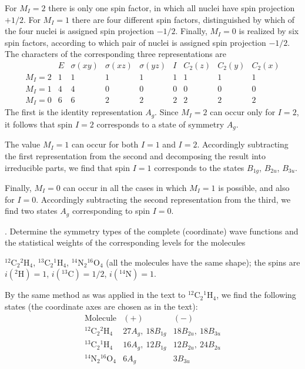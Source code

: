 For $M_I=2$ there is only one spin factor, in which all nuclei have spin projection $+1/2$. For $M_I=1$ there are four different spin factors, distinguished by which of the four nuclei is assigned spin projection $-1/2$. Finally, $M_I=0$ is realized by six spin factors, according to which pair of nuclei is assigned spin projection $-1/2$. The characters of the corresponding three representations are
\[
\begin{array}{c|cccccccc}
 &E&\sigma(xy)&\sigma(xz)&\sigma(yz)&I&C_2(z)&C_2(y)&C_2(x)\\\hline
M_I=2&1&1&1&1&1&1&1&1\\
M_I=1&4&4&0&0&0&0&0&0\\
M_I=0&6&6&2&2&2&2&2&2
\end{array}
\]
The first is the identity representation $A_g$. Since $M_I=2$ can occur only for $I=2$, it follows that spin $I=2$ corresponds to a state of symmetry $A_g$.

The value $M_I=1$ can occur for both $I=1$ and $I=2$. Accordingly subtracting the first representation from the second and decomposing the result into irreducible parts, we find that spin $I=1$ corresponds to the states $B_{1g}$, $B_{2u}$, $B_{3u}$.

Finally, $M_I=0$ can occur in all the cases in which $M_I=1$ is possible, and also for $I=0$. Accordingly subtracting the second representation from the third, we find two states $A_g$ corresponding to spin $I=0$.

. Determine the symmetry types of the complete (coordinate) wave functions and the statistical weights of the corresponding levels for the molecules

${}^{12}\mathrm C_2{}^2\mathrm H_4$, ${}^{13}\mathrm C_2{}^1\mathrm H_4$, ${}^{14}\mathrm N_2{}^{16}\mathrm O_4$ (all the molecules have the same shape); the spins are $i({}^2\mathrm H)=1$, $i({}^{13}\mathrm C)=1/2$, $i({}^{14}\mathrm N)=1$.

\SolutionHeading By the same method as was applied in the text to ${}^{12}\mathrm C_2{}^1\mathrm H_4$, we find the following states (the coordinate axes are chosen as in the text):
\[
\begin{array}{c|c|c}
\text{Molecule}&(+)&(-)\\\hline
{}^{12}\mathrm C_2{}^2\mathrm H_4&27A_g,\ 18B_{1g}&18B_{2u},\ 18B_{3u}\\
{}^{13}\mathrm C_2{}^1\mathrm H_4&16A_g,\ 12B_{1g}&12B_{2u},\ 24B_{2u}\\
{}^{14}\mathrm N_2{}^{16}\mathrm O_4&6A_g&3B_{3u}
\end{array}
\]

